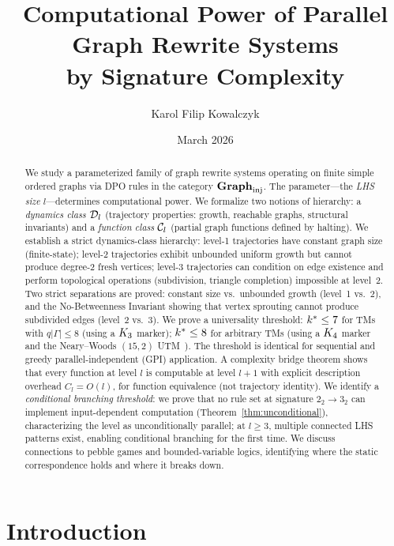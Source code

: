 \documentclass{../shared/primo}
\title{Computational Power of Parallel Graph Rewrite Systems\\by Signature Complexity}
\author{Karol Filip Kowalczyk}
\affiliation{AIRON Games}
\date{March 2026}
\begin{document}
\maketitle

\begin{abstract}
We study a parameterized family of graph rewrite systems operating on finite simple ordered graphs via DPO rules in the category $\mathbf{Graph}_{\mathrm{inj}}$. The parameter---the \emph{LHS size} $l$---determines computational power. We formalize two notions of hierarchy: a \emph{dynamics class} $\mathcal{D}_{l}$ (trajectory properties: growth, reachable graphs, structural invariants) and a \emph{function class} $\mathcal{C}_{l}$ (partial graph functions defined by halting). We establish a strict dynamics-class hierarchy: level-1 trajectories have constant graph size (finite-state); level-2 trajectories exhibit unbounded uniform growth but cannot produce degree-2 fresh vertices; level-3 trajectories can condition on edge existence and perform topological operations (subdivision, triangle completion) impossible at level~2. Two strict separations are proved: constant size vs.\ unbounded growth (level~1 vs.~2), and the No-Betweenness Invariant showing that vertex sprouting cannot produce subdivided edges (level~2 vs.~3). We prove a universality threshold: $k^* \leq 7$ for TMs with $q|\Gamma| \leq 8$ (using a $K_{3}$ marker); $k^* \leq 8$ for arbitrary TMs (using a $K_{4}$ marker and the Neary--Woods $(15,2)$ UTM~\cite{neary2009four}). The threshold is identical for sequential and greedy parallel-independent (GPI) application. A complexity bridge theorem shows that every function at level $l$ is computable at level $l+1$ with explicit description overhead $C_l = O(l)$, for function equivalence (not trajectory identity). We identify a \emph{conditional branching threshold}: we prove that no rule set at signature $2_2 \to 3_2$ can implement input-dependent computation (Theorem~\ref{thm:unconditional}), characterizing the level as unconditionally parallel; at $l \geq 3$, multiple connected LHS patterns exist, enabling conditional branching for the first time. We discuss connections to pebble games and bounded-variable logics, identifying where the static correspondence holds and where it breaks down.
\end{abstract}

\section{Introduction}
\label{sec:intro}
\end{document}
